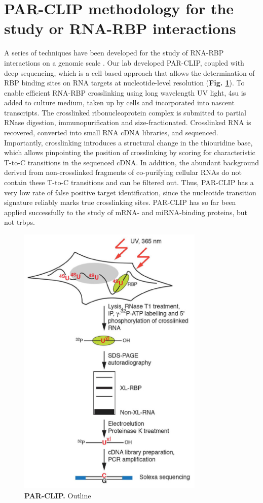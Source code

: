 \documentclass[12pt]{rockefeller}
\begin{document}
\section{PAR-CLIP methodology for the study or RNA-RBP interactions}
A series of techniques have been developed for the study of RNA-RBP interactions on a genomic scale \cite{Konig:2011jv}. Our lab developed PAR-CLIP, coupled with deep sequencing, which is a cell-based approach that allows the determination of RBP binding sites on RNA targets at nucleotide-level resolution (\textbf{Fig. \ref{parclip}}\cite{Hafner:2010kr}). To enable efficient RNA-RBP crosslinking using long wavelength UV light, \gls{4su} is added to culture medium, taken up by cells and incorporated into nascent transcripts. The crosslinked ribonucleoprotein complex is submitted to partial RNase digestion, immunopurification and size-fractionated. Crosslinked RNA is recovered, converted into small RNA cDNA libraries, and sequenced. Importantly, crosslinking introduces a structural change in the thiouridine base, which allows pinpointing the position of crosslinking by scoring for characteristic T-to-C transitions in the sequenced cDNA. In addition, the abundant background derived from non-crosslinked fragments of co-purifying cellular RNAs do not contain these T-to-C transitions and can be filtered out. Thus, PAR-CLIP has a very low rate of false positive target identification, since the nucleotide transition signature reliably marks true crosslinking sites. PAR-CLIP has so far been applied successfully to the study of mRNA- and miRNA-binding proteins, but not \glspl{trbp}.

\begin{figure}[!ht]%
\centering
\includegraphics[width=3.5in]{parclip.png}%
\caption[PAR-CLIP]
{\textbf{PAR-CLIP.}
Outline}
\centering
\label{parclip}%
\end{figure}
\end{document}

